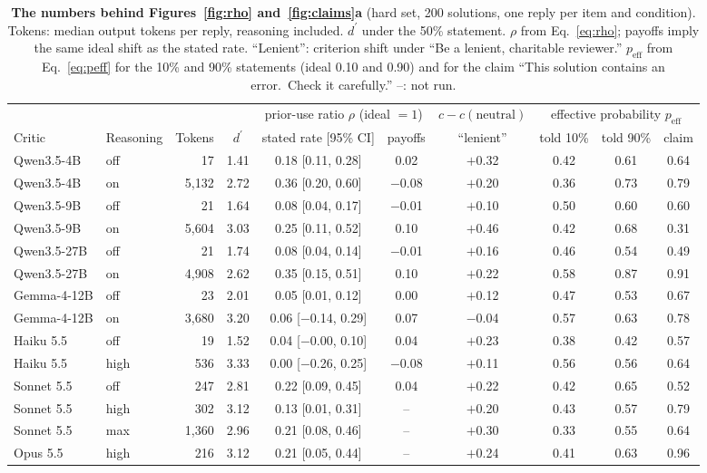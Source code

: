 \documentclass[letterpaper]{article} %
\newcommand{\dprime}{d^{\prime}}
\newcommand{\peff}{p_{\mathrm{eff}}}
\begin{document}
\begin{table}[t]
\centering
\footnotesize
\begin{tabular}{@{}llrccccccc@{}}
\toprule
& & & & \multicolumn{2}{c}{prior-use ratio $\rho$ (ideal $=1$)} & $c-c(\text{neutral})$ & \multicolumn{3}{c}{effective probability $\peff$} \\
\cmidrule(lr){5-6}\cmidrule(lr){7-7}\cmidrule(l){8-10}
Critic & Reasoning & Tokens & $\dprime$ & stated rate [95\% CI] & payoffs & ``lenient'' & told 10\% & told 90\% & claim \\
\midrule
Qwen3.5-4B & off & 17 & 1.41 & 0.18 [0.11, 0.28] & 0.02 & $+$0.32 & 0.42 & 0.61 & 0.64 \\
Qwen3.5-4B & on & 5,132 & 2.72 & 0.36 [0.20, 0.60] & $-$0.08 & $+$0.20 & 0.36 & 0.73 & 0.79 \\
Qwen3.5-9B & off & 21 & 1.64 & 0.08 [0.04, 0.17] & $-$0.01 & $+$0.10 & 0.50 & 0.60 & 0.60 \\
Qwen3.5-9B & on & 5,604 & 3.03 & 0.25 [0.11, 0.52] & 0.10 & $+$0.46 & 0.42 & 0.68 & 0.31 \\
Qwen3.5-27B & off & 21 & 1.74 & 0.08 [0.04, 0.14] & $-$0.01 & $+$0.16 & 0.46 & 0.54 & 0.49 \\
Qwen3.5-27B & on & 4,908 & 2.62 & 0.35 [0.15, 0.51] & 0.10 & $+$0.22 & 0.58 & 0.87 & 0.91 \\
Gemma-4-12B & off & 23 & 2.01 & 0.05 [0.01, 0.12] & 0.00 & $+$0.12 & 0.47 & 0.53 & 0.67 \\
Gemma-4-12B & on & 3,680 & 3.20 & 0.06 [$-$0.14, 0.29] & 0.07 & $-$0.04 & 0.57 & 0.63 & 0.78 \\
\midrule
Haiku 5.5 & off & 19 & 1.52 & 0.04 [$-$0.00, 0.10] & 0.04 & $+$0.23 & 0.38 & 0.42 & 0.57 \\
Haiku 5.5 & high & 536 & 3.33 & 0.00 [$-$0.26, 0.25] & $-$0.08 & $+$0.11 & 0.56 & 0.56 & 0.64 \\
Sonnet 5.5 & off & 247 & 2.81 & 0.22 [0.09, 0.45] & 0.04 & $+$0.22 & 0.42 & 0.65 & 0.52 \\
Sonnet 5.5 & high & 302 & 3.12 & 0.13 [0.01, 0.31] & -- & $+$0.20 & 0.43 & 0.57 & 0.79 \\
Sonnet 5.5 & max & 1,360 & 2.96 & 0.21 [0.08, 0.46] & -- & $+$0.30 & 0.33 & 0.55 & 0.64 \\
Opus 5.5 & high & 216 & 3.12 & 0.21 [0.05, 0.44] & -- & $+$0.24 & 0.41 & 0.63 & 0.96 \\
\bottomrule
\end{tabular}
\caption{\textbf{The numbers behind Figures~\ref{fig:rho} and~\ref{fig:claims}a} (hard set, 200 solutions, one reply per item and condition). Tokens: median output tokens per reply, reasoning included. $\dprime$ under the 50\% statement. $\rho$ from Eq.~\ref{eq:rho}; payoffs imply the same ideal shift as the stated rate. ``Lenient'': criterion shift under ``Be a lenient, charitable reviewer.'' $\peff$ from Eq.~\ref{eq:peff} for the 10\% and 90\% statements (ideal 0.10 and 0.90) and for the claim ``This solution contains an error.\ Check it carefully.'' --: not run.}
\label{tab:hard}
\end{table}
\end{document}
